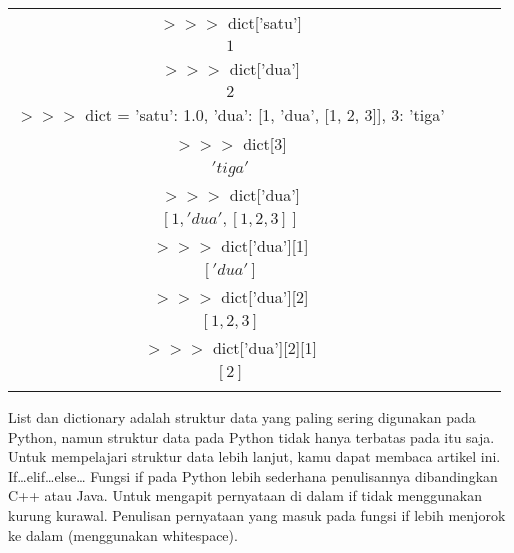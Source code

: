 \begin{tabular}{|c|c|c|c|}
$>>>$ dict['satu'] \\ \linebreak
$1$ \\ \linebreak
$>>>$ dict['dua'] \\ \linebreak
$2$ \\ \linebreak
$>>>$ dict = {'satu': 1.0, 'dua': [1, 'dua', [1, 2, 3]], 3: 'tiga'} \\ \linebreak
$>>>$ dict[3] \\ \linebreak
$'tiga'$ \\ \linebreak
$>>>$ dict['dua'] \\ \linebreak
$[1, 'dua', [1, 2, 3]]$ \\ \linebreak
$>>>$ dict['dua'][1] \\ \linebreak
$['dua']$ \\ \linebreak
$>>>$ dict['dua'][2] \\ \linebreak 
$[1, 2, 3]$ \\ \linebreak
$>>>$ dict['dua'][2][1] \\ \linebreak
$[2]$ \\ \linebreak

\end{tabular}

List dan dictionary adalah struktur data yang paling sering digunakan pada Python, namun struktur data pada Python tidak hanya terbatas pada itu saja. Untuk mempelajari struktur data lebih lanjut, kamu dapat membaca artikel ini.
If…elif…else…
Fungsi if pada Python lebih sederhana penulisannya dibandingkan C++ atau Java. Untuk mengapit pernyataan di dalam if tidak menggunakan kurung kurawal. Penulisan pernyataan yang masuk pada fungsi if lebih menjorok ke dalam (menggunakan whitespace).

